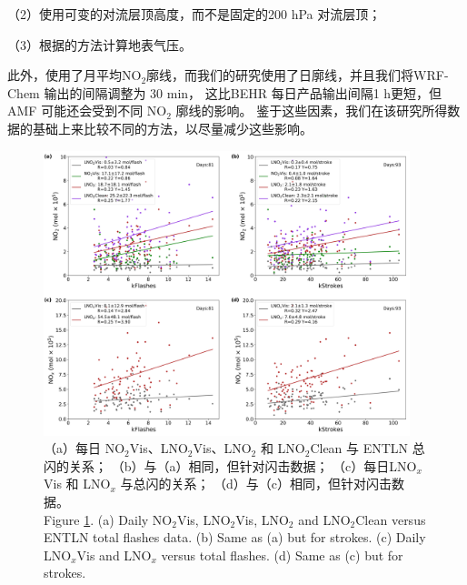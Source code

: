 （2）使用可变的对流层顶高度，而不是固定的200 hPa 对流层顶；

（3）根据\citet{Zhou.2009}的方法计算地表气压。

此外，\citet{Lapierre.2020}使用了月平均NO$_2$廓线，而我们的研究使用了日廓线，并且我们将WRF-Chem 输出的间隔调整为 30 min，
这比BEHR 每日产品输出间隔1 h更短，但 AMF 可能还会受到不同 NO$_2$ 廓线的影响。
鉴于这些因素，我们在该研究所得数据的基础上来比较不同的方法，以尽量减少这些影响。

\begin{figure}[H]
\centering
\includegraphics[width=0.95\textwidth]{./figures/us_pe_linear.png}
\caption{（a）每日 NO$_2$Vis、LNO$_2$Vis、LNO$_2$ 和 LNO$_2$Clean 与 ENTLN 总闪的关系；
（b）与（a）相同，但针对闪击数据；
（c）每日LNO$_x$Vis 和 LNO$_x$ 与总闪的关系；
（d）与（c）相同，但针对闪击数据。\\
Figure \ref{fig:us_pe_linear}.
(a) Daily NO$_2$Vis, LNO$_2$Vis, LNO$_2$ and LNO$_2$Clean versus ENTLN total flashes data.
(b) Same as (a) but for strokes.
(c) Daily LNO$_x$Vis and LNO$_x$ versus total flashes.
(d) Same as (c) but for strokes.}
\label{fig:us_pe_linear}
\end{figure}

